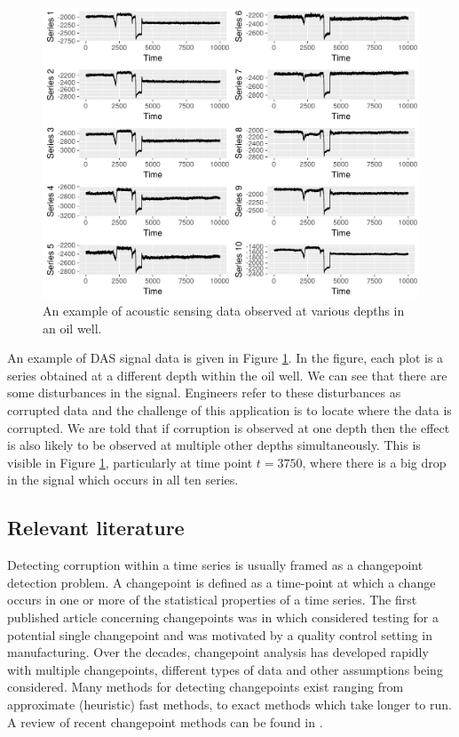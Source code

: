 \begin{figure}[h]
   \centering
   \includegraphics[width = 14cm]{multiplot_wider_new} 
   \caption{An example of acoustic sensing data observed at various depths in an oil well. }
   \label{fig:oil_example}
 \end{figure}

An example of DAS signal data is given in Figure \ref{fig:oil_example}. In the figure, each plot is a series obtained at a different depth within the oil well. We can  see that there are some disturbances in the signal. Engineers refer to these disturbances as corrupted data and the challenge of this application is to locate where the data is corrupted. We are told that if corruption is observed at one depth then the effect is also likely to be observed at multiple other depths simultaneously. This is visible in Figure \ref{fig:oil_example}, particularly at time point $t =  3750$, where there is a big drop in the signal which occurs in all ten series.

\subsection{Relevant literature}

Detecting corruption within a time series is usually framed as a changepoint detection problem. A changepoint is defined as a time-point at which a change occurs in one or more of the statistical properties of a time series. The first published article concerning changepoints was in \cite{Page1954} which considered testing for a potential single changepoint and was motivated by a quality control setting in manufacturing. Over the decades, changepoint analysis has developed rapidly with multiple changepoints, different types of data and other assumptions being considered. Many methods for detecting changepoints exist ranging from approximate (heuristic) fast methods, to exact methods which take longer to run. A review of recent changepoint methods can be found in \cite{Chen2012,Eckley2011b}.

